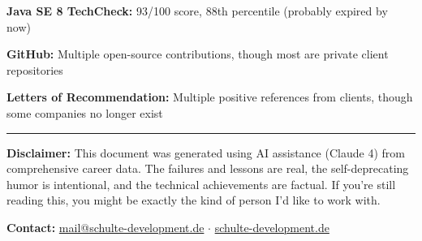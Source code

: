 \documentclass[11pt,a4paper]{article}
\begin{document}
\textbf{Java SE 8 TechCheck:} 93/100 score, 88th percentile (probably expired by now)

\textbf{GitHub:} Multiple open-source contributions, though most are private client repositories

\textbf{Letters of Recommendation:} Multiple positive references from clients, though some companies no longer exist

\vspace{2em}

\hrule

\vspace{0.5em}

\textbf{Disclaimer:} This document was generated using AI assistance (Claude 4) from comprehensive career data. The failures and lessons are real, the self-deprecating humor is intentional, and the technical achievements are factual. If you're still reading this, you might be exactly the kind of person I'd like to work with.

\textbf{Contact:} \href{mailto:mail@schulte-development.de}{mail@schulte-development.de} $\cdot$ \href{https://schulte-development.de}{schulte-development.de}
\end{document}
